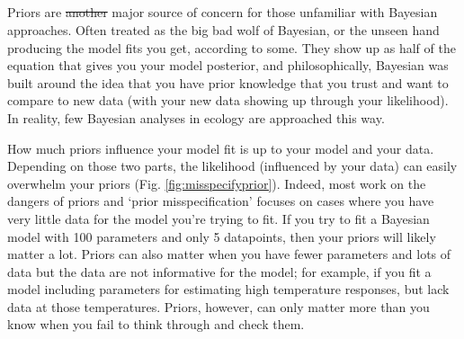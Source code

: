 \documentclass[11pt]{article}
\providecommand{\DIFaddtex}[1]{{\protect\color{blue}\uwave{#1}}} %
\providecommand{\DIFdeltex}[1]{{\protect\color{red}\sout{#1}}}                      %
\providecommand{\DIFaddbegin}{} %
\providecommand{\DIFaddend}{} %
\providecommand{\DIFdelbegin}{} %
\providecommand{\DIFdelend}{} %
\providecommand{\DIFadd}[1]{\texorpdfstring{\DIFaddtex{#1}}{#1}} %
\providecommand{\DIFdel}[1]{\texorpdfstring{\DIFdeltex{#1}}{}} %
\newcommand{\DIFscaledelfig}{0.5}
\newlength{\DIFdelgraphicswidth} %
\newlength{\DIFdelgraphicsheight} %
\newcommand{\DIFaddincludegraphics}[2][]{{\color{blue}\fbox{\DIFOincludegraphics[#1]{#2}}}} %
\newcommand{\DIFdelincludegraphics}[2][]{%
\sbox{\DIFdelgraphicsbox}{\DIFOincludegraphics[#1]{#2}}%
\settoboxwidth{\DIFdelgraphicswidth}{\DIFdelgraphicsbox} %
\settoboxtotalheight{\DIFdelgraphicsheight}{\DIFdelgraphicsbox} %
\scalebox{\DIFscaledelfig}{%
\parbox[b]{\DIFdelgraphicswidth}{\usebox{\DIFdelgraphicsbox}\\[-\baselineskip] \rule{\DIFdelgraphicswidth}{0em}}\llap{\resizebox{\DIFdelgraphicswidth}{\DIFdelgraphicsheight}{%
\setlength{\unitlength}{\DIFdelgraphicswidth}%
\begin{picture}(1,1)%
\thicklines\linethickness{2pt} %
{\color[rgb]{1,0,0}\put(0,0){\framebox(1,1){}}}%
{\color[rgb]{1,0,0}\put(0,0){\line( 1,1){1}}}%
{\color[rgb]{1,0,0}\put(0,1){\line(1,-1){1}}}%
\end{picture}%
}\hspace*{3pt}}} %
} %
\DeclareRobustCommand{\DIFaddbegin}{\DIFOaddbegin \let\includegraphics\DIFaddincludegraphics} %
\DeclareRobustCommand{\DIFaddend}{\DIFOaddend \let\includegraphics\DIFOincludegraphics} %
\DeclareRobustCommand{\DIFdelbegin}{\DIFOdelbegin \let\includegraphics\DIFdelincludegraphics} %
\DeclareRobustCommand{\DIFdelend}{\DIFOaddend \let\includegraphics\DIFOincludegraphics} %
\begin{document}
\DIFaddbegin \subsection{\DIFadd{Priors}}
\DIFaddend %
Priors are \DIFdelbegin \DIFdel{another }\DIFdelend \DIFaddbegin \DIFadd{a }\DIFaddend major source of concern for those unfamiliar with Bayesian approaches. Often treated as the big bad wolf of Bayesian, or the unseen hand producing the model fits you get, according to some. They show up as half of the equation that gives you your model posterior, and philosophically, Bayesian was built around the idea that you have prior knowledge that you trust and want to compare to new data (with your new data showing up through your likelihood). In reality, few Bayesian analyses in ecology are approached this way. 

How much priors influence your model fit is up to your model and your data. Depending on those two parts, the likelihood (influenced by your data) can easily overwhelm your priors (Fig. \ref{fig:misspecifyprior}). Indeed, most work on the dangers of priors and `prior misspecification'  focuses on cases where you have very little data for the model you're trying to fit. If you try to fit a Bayesian model with 100 parameters and only 5 datapoints, then your priors will likely matter a lot. Priors can also matter when you have fewer parameters and lots of data but the data are not informative for the model; for example, if you fit a model including parameters for estimating high temperature responses, but lack data at those temperatures. Priors, however, can only matter more than you know when you fail to think through and check them. 
\end{document}
